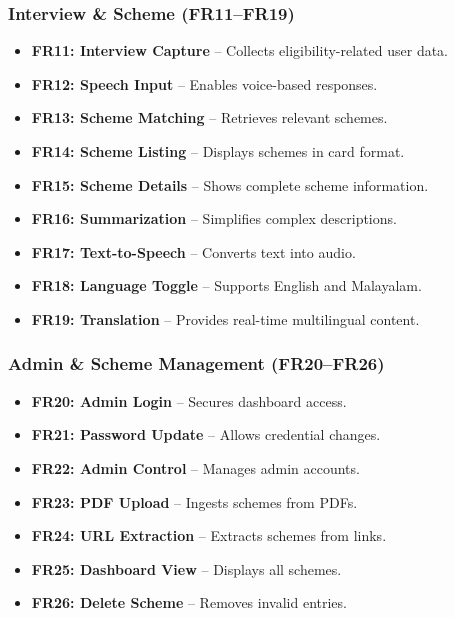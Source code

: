 \subsubsection{Interview \& Scheme (FR11--FR19)}
\begin{itemize}
    \item \textbf{FR11: Interview Capture} -- Collects eligibility-related user data.
    \item \textbf{FR12: Speech Input} -- Enables voice-based responses.
    \item \textbf{FR13: Scheme Matching} -- Retrieves relevant schemes.
    \item \textbf{FR14: Scheme Listing} -- Displays schemes in card format.
    \item \textbf{FR15: Scheme Details} -- Shows complete scheme information.
    \item \textbf{FR16: Summarization} -- Simplifies complex descriptions.
    \item \textbf{FR17: Text-to-Speech} -- Converts text into audio.
    \item \textbf{FR18: Language Toggle} -- Supports English and Malayalam.
    \item \textbf{FR19: Translation} -- Provides real-time multilingual content.
\end{itemize}

\subsubsection{Admin \& Scheme Management (FR20--FR26)}
\begin{itemize}
    \item \textbf{FR20: Admin Login} -- Secures dashboard access.
    \item \textbf{FR21: Password Update} -- Allows credential changes.
    \item \textbf{FR22: Admin Control} -- Manages admin accounts.
    \item \textbf{FR23: PDF Upload} -- Ingests schemes from PDFs.
    \item \textbf{FR24: URL Extraction} -- Extracts schemes from links.
    \item \textbf{FR25: Dashboard View} -- Displays all schemes.
    \item \textbf{FR26: Delete Scheme} -- Removes invalid entries.
\end{itemize}


